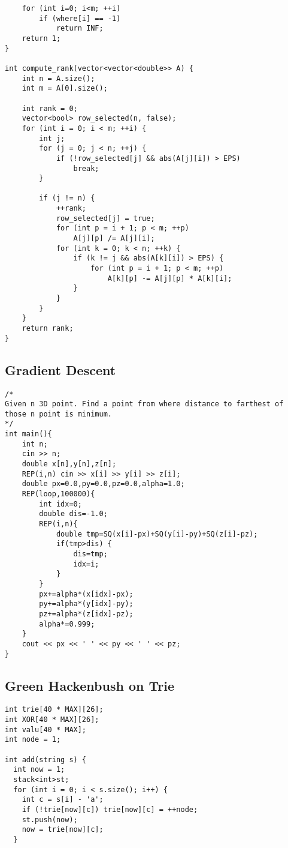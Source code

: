 \documentclass[10pt,a4paper,onesided]{article}
\begin{document}
\begin{multicols*}{3}
\begin{lstlisting}
    for (int i=0; i<m; ++i)
        if (where[i] == -1)
            return INF;
    return 1;
}

int compute_rank(vector<vector<double>> A) {
    int n = A.size();
    int m = A[0].size();

    int rank = 0;
    vector<bool> row_selected(n, false);
    for (int i = 0; i < m; ++i) {
        int j;
        for (j = 0; j < n; ++j) {
            if (!row_selected[j] && abs(A[j][i]) > EPS)
                break;
        }

        if (j != n) {
            ++rank;
            row_selected[j] = true;
            for (int p = i + 1; p < m; ++p)
                A[j][p] /= A[j][i];
            for (int k = 0; k < n; ++k) {
                if (k != j && abs(A[k][i]) > EPS) {
                    for (int p = i + 1; p < m; ++p)
                        A[k][p] -= A[j][p] * A[k][i];
                }
            }
        }
    }
    return rank;
}\end{lstlisting}
\subsection{Gradient Descent}
\begin{lstlisting}
/*
Given n 3D point. Find a point from where distance to farthest of those n point is minimum.
*/
int main(){
    int n;
    cin >> n;
    double x[n],y[n],z[n];
    REP(i,n) cin >> x[i] >> y[i] >> z[i];
    double px=0.0,py=0.0,pz=0.0,alpha=1.0;
    REP(loop,100000){
        int idx=0;
        double dis=-1.0;
        REP(i,n){
            double tmp=SQ(x[i]-px)+SQ(y[i]-py)+SQ(z[i]-pz);
            if(tmp>dis) {
                dis=tmp;
                idx=i;
            }
        }
        px+=alpha*(x[idx]-px);
        py+=alpha*(y[idx]-py);
        pz+=alpha*(z[idx]-pz);
        alpha*=0.999;
    }
    cout << px << ' ' << py << ' ' << pz;
}
\end{lstlisting}
\subsection{Green Hackenbush on Trie}
\begin{lstlisting}
int trie[40 * MAX][26];
int XOR[40 * MAX][26];
int valu[40 * MAX];
int node = 1;

int add(string s) {
  int now = 1;
  stack<int>st;
  for (int i = 0; i < s.size(); i++) {
    int c = s[i] - 'a';
    if (!trie[now][c]) trie[now][c] = ++node;
    st.push(now);
    now = trie[now][c];
  }


\end{lstlisting}
\end{multicols*}
\end{document}
